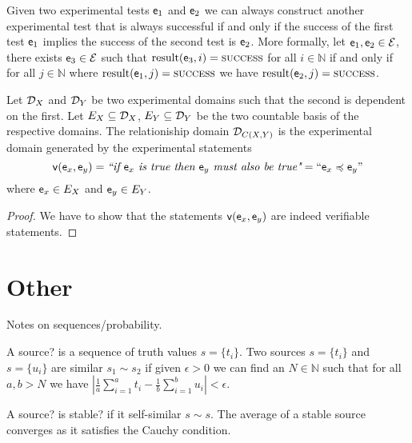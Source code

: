 \documentclass[11pt,letterpaper,fleqn]{memoir} %
\begin{document}
\begin{mathSection}
	\begin{axiom}
		Given two experimental tests $\expt_1$ and $\expt_2$ we can always construct another experimental test that is always successful if and only if the success of the first test $\expt_1$ implies the success of the second test is $\expt_2$. More formally, let $\expt_1, \expt_2 \in \exptSet$, there exists $\expt_3 \in \exptSet$ such that $\result(\expt_3, i) = \SUCCESS$ for all $i \in \mathbb{N}$ if and only if for all $j \in \mathbb{N}$ where $\result(\expt_1, j) = \SUCCESS$ we have $\result(\expt_2, j) = \SUCCESS$.
	\end{axiom}
	\begin{defn}
		Let $\edomain_X$ and $\edomain_Y$ be two experimental domains such that the second is dependent on the first. Let $E_X \subseteq \edomain_X$,  $E_Y \subseteq \edomain_Y$ be the two countable basis of the respective domains. The relationiship domain $\edomain_{C(X,Y)}$ is the experimental domain generated by the experimental statements
		$$\obs[v](\obs[e]_x, \obs[e]_y) = \statement{if $\obs[e]_x$ is true then $\obs[e]_y$ must also be true}=``\obs[e]_x \narrower \obs[e]_y"$$
		where $\obs[e]_x \in E_X$ and $ \obs[e]_y \in E_Y$.
	\end{defn}
	\begin{proof}
		We have to show that the statements $\obs[v](\obs[e]_x, \obs[e]_y)$ are indeed verifiable statements.
	\end{proof}
\end{mathSection}

\chapter{Other}

Notes on sequences/probability.

A source? is a sequence of truth values $s=\{t_i\}$. Two sources $s=\{t_i\}$ and $s=\{u_i\}$ are similar $s_1 \sim s_2$ if given $\epsilon > 0$ we can find an $N \in \mathbb{N}$ such that for all $a,b>N$ we have $\left| \frac{1}{a} \sum\limits_{i=1}^a t_i - \frac{1}{b} \sum\limits_{i=1}^b u_i \right| < \epsilon$.

A source? is stable? if it self-similar $s \sim s$. The average of a stable source converges as it satisfies the Cauchy condition.

	
\end{document}
